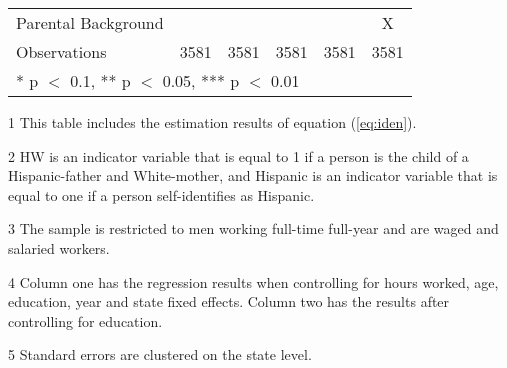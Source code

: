 \begin{table}[H]
{\begin{threeparttable}
\begin{tabular}[t]{lccccc}
Parental Background &  &  &  &  & X\\
Observations & \num{3581} & \num{3581} & \num{3581} & \num{3581} & \num{3581}\\
\bottomrule
\multicolumn{6}{l}{\rule{0pt}{1em}* p $<$ 0.1, ** p $<$ 0.05, *** p $<$ 0.01}\\
\end{tabular}
\begin{tablenotes}
\item[1] \footnotesize{This table includes the estimation results of equation (\ref{eq:iden}).}
\item[2] \footnotesize{HW is an indicator variable that is equal to 1 if a person is the child of a Hispanic-father and White-mother, and Hispanic is an indicator variable that is equal to one if a person self-identifies as Hispanic.}
\item[3] \footnotesize{The sample is restricted to men working full-time full-year and are waged and salaried workers.}
\item[4] \footnotesize{Column one has the regression results when controlling for hours worked, age, education, year and state fixed effects. Column two has the results after controlling for education.}
\item[5] {\footnotesize{Standard errors are clustered on the state level.}}
\end{tablenotes}
\end{threeparttable}}
\end{table}
